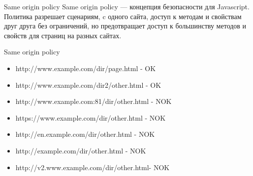\begin{frame}{Same origin policy}
Same origin policy — концепция безопасности для Javascript.
Политика разрешает сценариям, c одного сайта, доступ к методам и свойствам друг друга без ограничений, но предотвращает доступ к большинству методов и свойств для страниц на разных сайтах.
\end{frame}
\begin{frame}{Same origin policy}
 \begin{center}
 \begin{itemize}
 \scriptsize
 \item http://www.example.com/dir/page.html - OK
 \item http://www.example.com/dir2/other.html	 - OK
 \item http://www.example.com:81/dir/other.html -	NOK
 \item https://www.example.com/dir/other.html -	NOK
 \item http://en.example.com/dir/other.html -	NOK
 \item http://example.com/dir/other.html - NOK
 \item http://v2.www.example.com/dir/other.html- NOK
 \end{itemize}
 \end{center}
\end{frame}